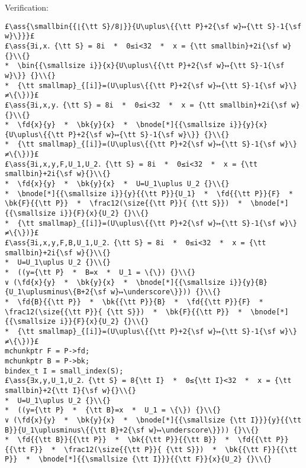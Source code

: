 \documentclass[10pt,twoside]{report}
\makeatletter
\newcommand{\ml}[2][t]{\mbox{\mdseries\begin{tabular}[#1]{@{}L@{}}#2\end{tabular}}}
\newcommand{\ass}[1]{\ensuremath{{\color{blue}\left\{\ml[c]{#1}\right\}}}}
\makeatother
\begin{document}
\noindent Verification:
\begin{lstlisting}
£\ass{\smallbin{{⌊{\tt S}/8⌋}}{U\uplus\{{\tt P}+2{\sf w}↦{\tt S}-1{\sf w}\}}}£
£\ass{∃i,x．{\tt S} = 8i  *  0≤i<32  *  x = {\tt smallbin}+2i{\sf w}{}\\{}
*  \bin{{\smallsize i}}{x}{U\uplus\{{\tt P}+2{\sf w}↦{\tt S}-1{\sf w}\}} {}\\{}
*  {\tt smallmap}_{[i]}=(U\uplus\{{\tt P}+2{\sf w}↦{\tt S}-1{\sf w}\}≠\{\})}£
£\ass{∃i,x,y．{\tt S} = 8i  *  0≤i<32  *  x = {\tt smallbin}+2i{\sf w}{}\\{}
*  \fd{x}{y}  *  \bk{y}{x}  *  \bnode[*]{{\smallsize i}}{y}{x}{U\uplus\{{\tt P}+2{\sf w}↦{\tt S}-1{\sf w}\}} {}\\{}
*  {\tt smallmap}_{[i]}=(U\uplus\{{\tt P}+2{\sf w}↦{\tt S}-1{\sf w}\}≠\{\})}£
£\ass{∃i,x,y,F,U_1,U_2．{\tt S} = 8i  *  0≤i<32  *  x = {\tt smallbin}+2i{\sf w}{}\\{}
*  \fd{x}{y}  *  \bk{y}{x}  *  U=U_1\uplus U_2 {}\\{}
*  \bnode[*]{{\smallsize i}}{y}{{\tt P}}{U_1}  *  \fd{{\tt P}}{F}  *  \bk{F}{{\tt P}}  *  \frac12(\size{{\tt P}}{ {\tt S}})  *  \bnode[*]{{\smallsize i}}{F}{x}{U_2} {}\\{}
*  {\tt smallmap}_{[i]}=(U\uplus\{{\tt P}+2{\sf w}↦{\tt S}-1{\sf w}\}≠\{\})}£
£\ass{∃i,x,y,F,B,U_1,U_2．{\tt S} = 8i  *  0≤i<32  *  x = {\tt smallbin}+2i{\sf w}{}\\{}
*  U=U_1\uplus U_2 {}\\{}
*  ((y={\tt P}  *  B=x  *  U_1 = \{\}) {}\\{}
∨ (\fd{x}{y}  *  \bk{y}{x}  *  \bnode[*]{{\smallsize i}}{y}{B}{U_1\uplusminus\{B+2{\sf w}↦\underscore\}})) {}\\{}
*  \fd{B}{{\tt P}}  *  \bk{{\tt P}}{B}  *  \fd{{\tt P}}{F}  *  \frac12(\size{{\tt P}}{ {\tt S}})  *  \bk{F}{{\tt P}}  *  \bnode[*]{{\smallsize i}}{F}{x}{U_2} {}\\{}
*  {\tt smallmap}_{[i]}=(U\uplus\{{\tt P}+2{\sf w}↦{\tt S}-1{\sf w}\}≠\{\})}£
mchunkptr F = P->fd;
mchunkptr B = P->bk;
bindex_t I = small_index(S);
£\ass{∃x,y,U_1,U_2．{\tt S} = 8{\tt I}  *  0≤{\tt I}<32  *  x = {\tt smallbin}+2{\tt I}{\sf w}{}\\{}
*  U=U_1\uplus U_2 {}\\{}
*  ((y={\tt P}  *  {\tt B}=x  *  U_1 = \{\}) {}\\{}
∨ (\fd{x}{y}  *  \bk{y}{x}  *  \bnode[*]{{\smallsize {\tt I}}}{y}{{\tt B}}{U_1\uplusminus\{{\tt B}+2{\sf w}↦\underscore\}})) {}\\{}
*  \fd{{\tt B}}{{\tt P}}  *  \bk{{\tt P}}{{\tt B}}  *  \fd{{\tt P}}{{\tt F}}  *  \frac12(\size{{\tt P}}{ {\tt S}})  *  \bk{{\tt F}}{{\tt P}}  *  \bnode[*]{{\smallsize {\tt I}}}{{\tt F}}{x}{U_2} {}\\{}

\end{lstlisting}
\end{document}
